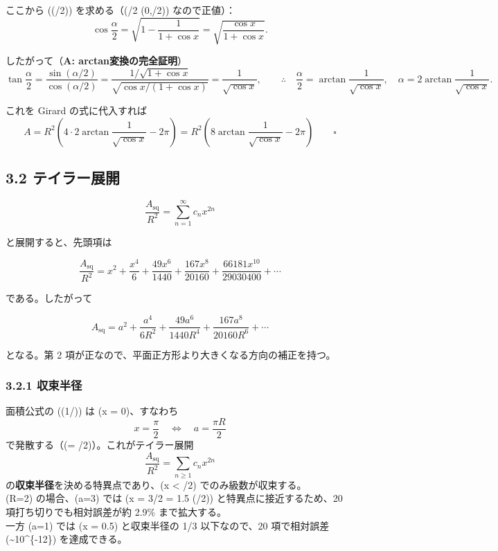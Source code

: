 \documentclass[
  12pt,
  a4paper,
]{article}
\begin{document}
ここから (\cos(\alpha/2)) を求める（(\alpha/2 \in (0,\pi/2))
なので正値）： \[
\cos\frac{\alpha}{2} = \sqrt{1-\frac{1}{1+\cos x}} = \sqrt{\frac{\cos x}{1+\cos x}}.
\]

したがって（\textbf{A: arctan変換の完全証明}） \[
\tan\frac{\alpha}{2}
= \frac{\sin(\alpha/2)}{\cos(\alpha/2)}
= \frac{1/\sqrt{1+\cos x}}{\sqrt{\cos x/(1+\cos x)}}
= \frac{1}{\sqrt{\cos x}},
\qquad
\therefore\quad
\frac{\alpha}{2} = \arctan\frac{1}{\sqrt{\cos x}},
\quad
\alpha = 2\arctan\frac{1}{\sqrt{\cos x}}.
\]

これを Girard の式に代入すれば \[
A = R^2\!\left(4 \cdot 2\arctan\frac{1}{\sqrt{\cos x}} - 2\pi\right)
= R^2\!\left(8\arctan\frac{1}{\sqrt{\cos x}} - 2\pi\right) \qquad \square
\]

\subsection{3.2
テイラー展開}\label{ux30c6ux30a4ux30e9ux30fcux5c55ux958b}

\[
\frac{A_{\mathrm{sq}}}{R^2} =
\sum_{n=1}^\infty c_n x^{2n}
\]

と展開すると、先頭項は

\[
\frac{A_{\mathrm{sq}}}{R^2} =
x^2
+\frac{x^4}{6}
+\frac{49x^6}{1440}
+\frac{167x^8}{20160}
+\frac{66181x^{10}}{29030400}
+\cdots
\]

である。したがって

\[
A_{\mathrm{sq}} =
a^2
+\frac{a^4}{6R^2}
+\frac{49a^6}{1440R^4}
+\frac{167a^8}{20160R^6}
+\cdots
\]

となる。第 2 項が正なので、平面正方形より大きくなる方向の補正を持つ。

\subsubsection{3.2.1 収束半径}\label{ux53ceux675fux534aux5f84}

面積公式の (\arctan(1/)) は (\cos x = 0)、すなわち \[
x = \frac{\pi}{2} \quad \Longleftrightarrow \quad a = \frac{\pi R}{2}
\] で発散する（(\arctan\infty = \pi/2)）。これがテイラー展開 \[
\frac{A_{\mathrm{sq}}}{R^2} = \sum_{n\ge 1} c_n x^{2n}
\] の\textbf{収束半径}を決める特異点であり、(\textbar x\textbar{}
\textless{} \pi/2) でのみ級数が収束する。\\
(R=2) の場合、(a=3) では (x = 3/2 = 1.5  \cdot (\pi/2))
と特異点に接近するため、20 項打ち切りでも相対誤差が約 2.9\%
まで拡大する。\\
一方 (a=1) では (x = 0.5) と収束半径の 1/3 以下なので、20 項で相対誤差
(\sim 10\^{}\{-12\}) を達成できる。
\end{document}
